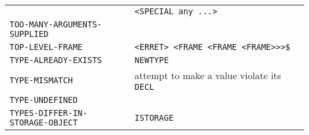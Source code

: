 \documentclass[a4paper]{scrbook}
\begin{document}
\begin{longtable}[]{@{}ll@{}}
\begin{minipage}[t]{0.58\columnwidth}
\end{minipage} & \begin{minipage}[t]{0.36\columnwidth}\raggedright\strut
\texttt{\textless{}SPECIAL\ any\ ...\textgreater{}}\strut
\end{minipage}\tabularnewline
\begin{minipage}[t]{0.58\columnwidth}\raggedright\strut
\texttt{TOO-MANY-ARGUMENTS-SUPPLIED}\strut
\end{minipage} & \begin{minipage}[t]{0.36\columnwidth}\raggedright\strut
\strut
\end{minipage}\tabularnewline
\begin{minipage}[t]{0.58\columnwidth}\raggedright\strut
\texttt{TOP-LEVEL-FRAME}\strut
\end{minipage} & \begin{minipage}[t]{0.36\columnwidth}\raggedright\strut
\texttt{\textless{}ERRET\textgreater{}\ \textless{}FRAME\ \textless{}FRAME\ \textless{}FRAME\textgreater{}\textgreater{}\textgreater{}\$}\strut
\end{minipage}\tabularnewline
\begin{minipage}[t]{0.58\columnwidth}\raggedright\strut
\texttt{TYPE-ALREADY-EXISTS}\strut
\end{minipage} & \begin{minipage}[t]{0.36\columnwidth}\raggedright\strut
\texttt{NEWTYPE}\strut
\end{minipage}\tabularnewline
\begin{minipage}[t]{0.58\columnwidth}\raggedright\strut
\texttt{TYPE-MISMATCH}\strut
\end{minipage} & \begin{minipage}[t]{0.36\columnwidth}\raggedright\strut
attempt to make a value violate its \texttt{DECL}\strut
\end{minipage}\tabularnewline
\begin{minipage}[t]{0.58\columnwidth}\raggedright\strut
\texttt{TYPE-UNDEFINED}\strut
\end{minipage} & \begin{minipage}[t]{0.36\columnwidth}\raggedright\strut
\strut
\end{minipage}\tabularnewline
\begin{minipage}[t]{0.58\columnwidth}\raggedright\strut
\texttt{TYPES-DIFFER-IN-STORAGE-OBJECT}\strut
\end{minipage} & \begin{minipage}[t]{0.36\columnwidth}\raggedright\strut
\texttt{ISTORAGE}\strut

\end{minipage}
\end{longtable}
\end{document}
